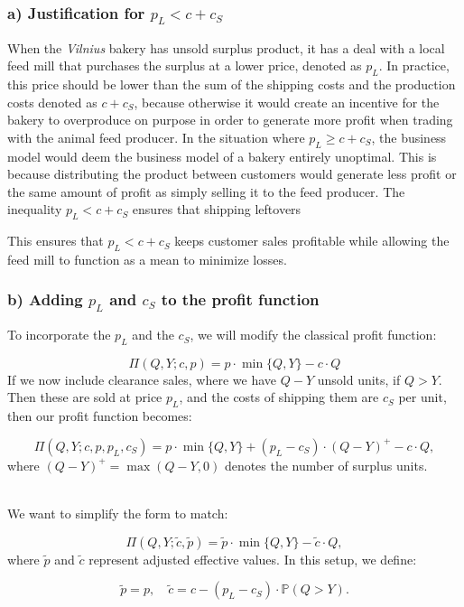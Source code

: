 \subsubsection*{\boldmath a) Justification for $p_L < c + c_S$}
\noindent
When the \emph{Vilnius} bakery has unsold surplus product, it has a deal with a local feed mill that purchases the surplus at a lower price, denoted as $p_L$. 
In practice, this price should be lower than the sum of the shipping costs and the production costs denoted as $c + c_S$, because otherwise it would create an incentive for the bakery to overproduce on purpose in order to generate more profit when trading with the animal feed producer. In the situation where $p_L \geq c + c_S$, the business model would deem the business model of a bakery entirely unoptimal. This is because distributing the product between customers would generate less profit or the same amount of profit as simply selling it to the feed producer. The inequality $p_L < c + c_S$ ensures that shipping leftovers

This ensures that $p_L < c + c_S$ keeps customer sales profitable while allowing the feed mill to function as a mean to minimize losses. 

\subsubsection*{\boldmath b) Adding $p_L$ and $c_S$ to the profit function}
\noindent 
To incorporate the $p_L$ %
and the $c_S$, %
 we will modify the classical profit function:

\[
\Pi(Q, Y; c, p) = p \cdot \min\{Q, Y\} - c \cdot Q
\]
\noindent
If we now include clearance sales, where we have $Q - Y$ unsold units, if $Q > Y$. Then these are sold at price $p_L$, and the costs of shipping them are $c_S$ per unit, then our profit function becomes:

\[
\Pi(Q, Y; c, p, p_L, c_S) = p \cdot \min\{Q, Y\} + (p_L - c_S) \cdot (Q - Y)^+ - c \cdot Q,
\]
\noindent
where $(Q - Y)^+ = \max(Q - Y, 0)$ denotes the number of surplus units.


\noindent
\\We want to simplify the form to match:

\[
\Pi(Q, Y; \tilde{c}, \tilde{p}) = \tilde{p} \cdot \min\{Q, Y\} - \tilde{c} \cdot Q,
\]
\noindent
where $\tilde{p}$ and $\tilde{c}$ represent adjusted effective values. In this setup, we define:

\[
\tilde{p} = p, \quad \tilde{c} = c - (p_L - c_S) \cdot \mathbb{P}(Q > Y).
\]

